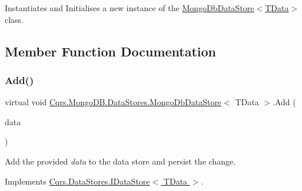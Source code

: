 Instantiates and Initialises a new instance of the \hyperlink{classCqrs_1_1MongoDB_1_1DataStores_1_1MongoDbDataStore_a039b75f6f011fa89b5dd724bee6b64cb_a039b75f6f011fa89b5dd724bee6b64cb}{Mongo\+Db\+Data\+Store$<$\+T\+Data$>$} class. 



\subsection{Member Function Documentation}
\mbox{\label{classCqrs_1_1MongoDB_1_1DataStores_1_1MongoDbDataStore_affcb1268469b99963501dd8c58e4a480_affcb1268469b99963501dd8c58e4a480}} 
\subsubsection{\texorpdfstring{Add()}{Add()}\hspace{0.1cm}{\footnotesize\ttfamily [1/2]}}
{\footnotesize\ttfamily virtual void \hyperlink{classCqrs_1_1MongoDB_1_1DataStores_1_1MongoDbDataStore}{Cqrs.\+Mongo\+D\+B.\+Data\+Stores.\+Mongo\+Db\+Data\+Store}$<$ T\+Data $>$.Add (\begin{DoxyParamCaption}\item[{T\+Data}]{data }\end{DoxyParamCaption})\hspace{0.3cm}{\ttfamily [virtual]}}



Add the provided {\itshape data}  to the data store and persist the change. 



Implements \hyperlink{interfaceCqrs_1_1DataStores_1_1IDataStore_a114404daaf37fec9cc5547cd9a17858c_a114404daaf37fec9cc5547cd9a17858c}{Cqrs.\+Data\+Stores.\+I\+Data\+Store$<$ T\+Data $>$}.

\mbox{\label{classCqrs_1_1MongoDB_1_1DataStores_1_1MongoDbDataStore_a709fc1e29d266a7c19a46bd181d03963_a709fc1e29d266a7c19a46bd181d03963}} 
